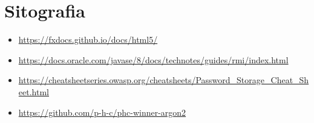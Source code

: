 \section{Sitografia}
\begin{itemize}
  \item \url{https://fxdocs.github.io/docs/html5/}
  \item \url{https://docs.oracle.com/javase/8/docs/technotes/guides/rmi/index.html}
  \item \url{https://cheatsheetseries.owasp.org/cheatsheets/Password_Storage_Cheat_Sheet.html}
  \item \url{https://github.com/p-h-c/phc-winner-argon2}
\end{itemize}
